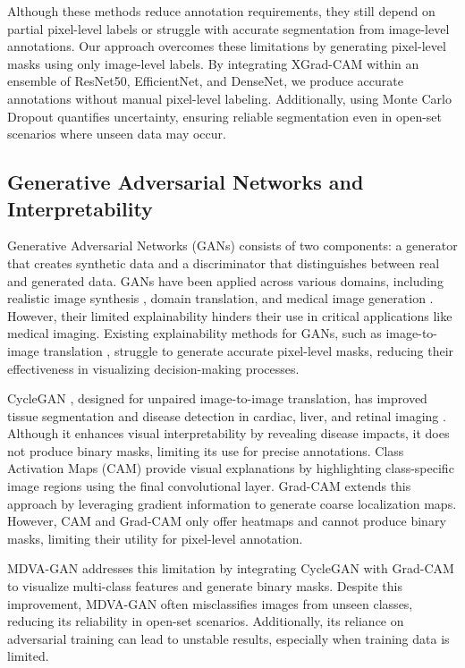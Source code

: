 Although these methods reduce annotation requirements, they still depend on partial pixel-level labels or struggle with accurate segmentation from image-level annotations. Our approach overcomes these limitations by generating pixel-level masks using only image-level labels. By integrating XGrad-CAM within an ensemble of ResNet50, EfficientNet, and DenseNet, we produce accurate annotations without manual pixel-level labeling. Additionally, using Monte Carlo Dropout quantifies uncertainty, ensuring reliable segmentation even in open-set scenarios where unseen data may occur.

\subsection{Generative Adversarial Networks and Interpretability}

Generative Adversarial Networks (GANs) \cite{ref21} consists of two components: a generator that creates synthetic data and a discriminator that distinguishes between real and generated data. GANs have been applied across various domains, including realistic image synthesis \cite{ref22}, domain translation, and medical image generation \cite{ref23}. However, their limited explainability hinders their use in critical applications like medical imaging. Existing explainability methods for GANs, such as image-to-image translation \cite{ref24,ref25}, struggle to generate accurate pixel-level masks, reducing their effectiveness in visualizing decision-making processes.

CycleGAN \cite{ref26}, designed for unpaired image-to-image translation, has improved tissue segmentation and disease detection in cardiac, liver, and retinal imaging \cite{ref27}. Although it enhances visual interpretability by revealing disease impacts, it does not produce binary masks, limiting its use for precise annotations. Class Activation Maps (CAM) \cite{ref28} provide visual explanations by highlighting class-specific image regions using the final convolutional layer. Grad-CAM \cite{ref29} extends this approach by leveraging gradient information to generate coarse localization maps. However, CAM and Grad-CAM only offer heatmaps and cannot produce binary masks, limiting their utility for pixel-level annotation.

MDVA-GAN \cite{ref30} addresses this limitation by integrating CycleGAN with Grad-CAM to visualize multi-class features and generate binary masks. Despite this improvement, MDVA-GAN often misclassifies images from unseen classes, reducing its reliability in open-set scenarios. Additionally, its reliance on adversarial training can lead to unstable results, especially when training data is limited.

